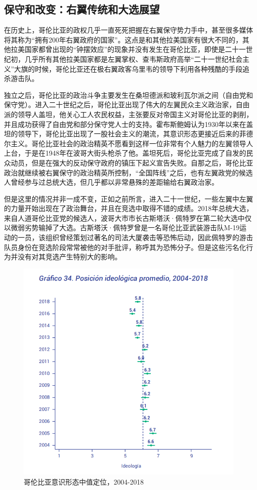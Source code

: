 \documentclass{phyasgn}\usepackage{nag}
\begin{document}
    \subsection{保守和改变：右翼传统和大选展望}
    在历史上，哥伦比亚的政权几乎一直死死把握在右翼保守势力手中，甚至很多媒体将其称为“拥有200年右翼政府的国家”。这点是和其他拉美国家有很大不同的，其他拉美国家都曾出现的“钟摆效应”的现象并没有发生在哥伦比亚，即使是二十一世纪初，几乎所有其他拉美国家都是左翼掌权、查韦斯政府高举“二十一世纪社会主义”大旗的时候，哥伦比亚还在极右翼政客乌里韦的领导下利用各种残酷的手段追杀游击队。
    \par 独立之后，哥伦比亚的政治斗争主要发生在桑坦德派和玻利瓦尔派之间（自由党和保守党）。进入二十世纪之后，哥伦比亚出现了伟大的左翼民众主义政治家，自由派的领导人盖坦，他关心工人农民权益，主张要反对帝国主义对哥伦比亚的剥削，并且成功获得了自由党和部分保守党人士的支持。霍布斯鲍姆认为1930年以来在盖坦的领导下，哥伦比亚出现了一股社会主义的潮流，其意识形态更接近后来的菲德尔主义。哥伦比亚社会的政治精英不愿看到这样一位非常有个人魅力的左翼领导人上台，于是在1948年在波哥大街头枪杀了他。盖坦死后，哥伦比亚完成了自发的民众动员，但是在强大的反动保守政府的镇压下起义宣告失败。自那之后，哥伦比亚政治就继续被右翼保守的政治精英所控制，“全国阵线”之后，也有左翼政党的候选人曾经参与过总统大选，但几乎都以非常悬殊的差距输给右翼政治家。
    \par 但是这里的情况并非一成不变，正如之前所言，进入二十一世纪，一些左翼中左翼的力量开始出现在了政治舞台，并且在竞选中取得不错的成绩。2018年总统大选，来自人道哥伦比亚党的候选人，波哥大市市长古斯塔沃·佩特罗在第二轮大选中仅以微弱劣势输掉了大选。古斯塔沃·佩特罗曾是一名哥伦比亚武装游击队M-19运动的一员，该组织曾经策划过著名的司法大厦袭击等恐怖后动，因此佩特罗的游击队员身份在竞选阶段常常被他的对手批评，称呼其为恐怖分子。但是这些污名化行为并没有对其竞选产生特别大的影响。
    \begin{figure}[!h]
                	\centering
                	\includegraphics[width=.9\linewidth]{pic/4.png}
                	\caption{哥伦比亚意识形态中值定位，2004-2018}
                	\label{fig:4}
                	\end{figure}
\end{document}
